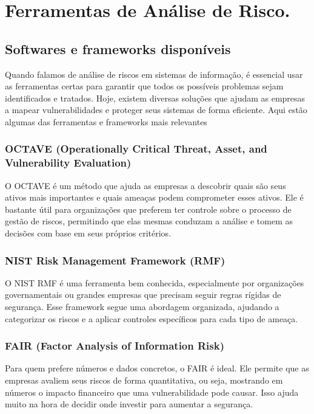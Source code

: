 \documentclass[12pt,oneside,a4paper,article]{abntex2}
\begin{document}
\section{\textbf{Ferramentas de Análise de Risco.}}
\subsection{{Softwares e frameworks disponíveis}}

{Quando falamos de análise de riscos em sistemas de informação, é essencial usar as ferramentas certas para garantir que todos os possíveis problemas sejam identificados e tratados. Hoje, existem diversas soluções que ajudam as empresas a mapear vulnerabilidades e proteger seus sistemas de forma eficiente. Aqui estão algumas das ferramentas e frameworks mais relevantes 

\subsubsection{ \textbf{OCTAVE (Operationally Critical Threat, Asset, and Vulnerability Evaluation)}}

O OCTAVE é um método que ajuda as empresas a descobrir quais são seus ativos mais importantes e quais ameaças podem comprometer esses ativos. Ele é bastante útil para organizações que preferem ter controle sobre o processo de gestão de riscos, permitindo que elas mesmas conduzam a análise e tomem as decisões com base em seus próprios critérios.

\subsubsection{ \textbf{NIST Risk Management Framework (RMF)}}

O NIST RMF é uma ferramenta bem conhecida, especialmente por organizações governamentais ou grandes empresas que precisam seguir regras rígidas de segurança. Esse framework segue uma abordagem organizada, ajudando a categorizar os riscos e a aplicar controles específicos para cada tipo de ameaça.

\subsubsection{ \textbf{FAIR (Factor Analysis of Information Risk)}}

Para quem prefere números e dados concretos, o FAIR é ideal. Ele permite que as empresas avaliem seus riscos de forma quantitativa, ou seja, mostrando em números o impacto financeiro que uma vulnerabilidade pode causar. Isso ajuda muito na hora de decidir onde investir para aumentar a segurança.

}
\end{document}
